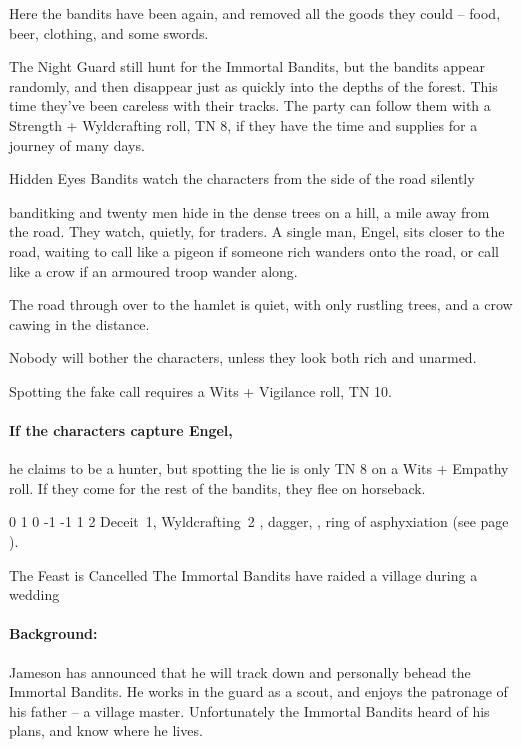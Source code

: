 \begin{multicols}{2}
Here the bandits have been again, and removed all the goods they could -- food, beer, clothing, and some swords.

The Night Guard still hunt for the Immortal Bandits, but the bandits appear randomly, and then disappear just as quickly into the depths of the forest.
This time they've been careless with their tracks.
The party can follow them with a Strength + Wyldcrafting roll, TN 8, if they have the time and supplies for a journey of many days.

{Hidden Eyes}%
{Bandits watch the characters from the side of the road silently}%

\Gls{banditking} and twenty men hide in the dense trees on a hill, a mile away from the road.
They watch, quietly, for traders.
A single man, Engel, sits closer to the road, waiting to call like a pigeon if someone rich wanders onto the road, or call like a crow if an armoured troop wander along.

\begin{boxtext}

  The road through over to the hamlet is quiet, with only rustling trees, and a crow cawing in the distance.

\end{boxtext}

Nobody will bother the characters, unless they look both rich and unarmed.

Spotting the fake call requires a Wits + Vigilance roll, TN 10.

\paragraph{If the characters capture Engel,}
he claims to be a hunter, but spotting the lie is only TN 8 on a Wits + Empathy roll.
If they come for the rest of the bandits, they flee on horseback.


{0}%
{1}%
{{0}%
{-1}%
{-1}}%
{1}%
{2}%
{Deceit~1, Wyldcrafting~2}%
{\shortsword, dagger, \partialleather, ring of asphyxiation (see page \pageref{ring_asphyxiation}).}%
{}

{The Feast is Cancelled}%
{The Immortal Bandits have raided a village during a wedding}%

\paragraph{Background:}
Jameson has announced that he will track down and personally behead the Immortal Bandits.
He works in the \gls{guard} as a scout, and enjoys the patronage of his father -- a village master.
Unfortunately the Immortal Bandits heard of his plans, and know where he lives.


\end{multicols}
